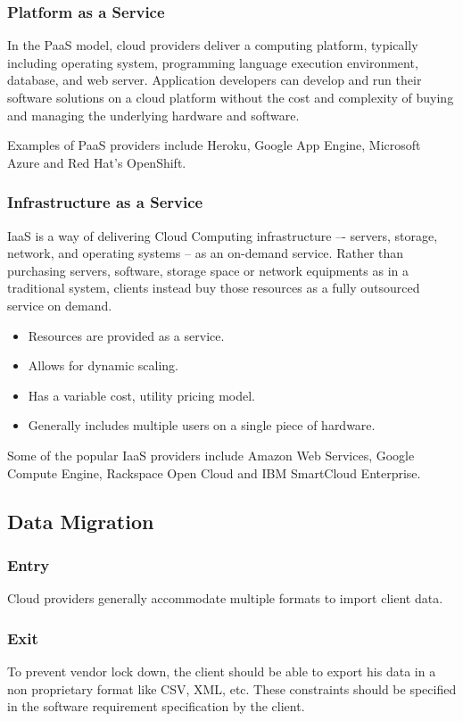 \documentclass[12pt,a4paper,oneside]{article}
\begin{document}
\subsubsection{Platform as a Service}
In the PaaS model, cloud providers deliver a computing platform, typically
including operating system, programming language execution environment,
database, and web server. Application developers can develop and run their
software solutions on a cloud platform without the cost and complexity of
buying and managing the underlying hardware and software.

Examples of PaaS providers include Heroku, Google App Engine, Microsoft Azure
and Red Hat's OpenShift.

\subsubsection{Infrastructure as a Service}
IaaS is a way of delivering Cloud Computing infrastructure –- servers, storage,
network, and operating systems – as an on-demand service. Rather than purchasing
servers, software, storage space or network equipments as in a traditional
system, clients instead buy those resources as a fully outsourced service on
demand.
\begin{itemize}
	\item Resources are provided as a service.
	\item Allows for dynamic scaling.
	\item Has a variable cost, utility pricing model.
	\item Generally includes multiple users on a single piece of hardware.
\end{itemize}
Some of the popular IaaS providers include Amazon Web Services, Google Compute
Engine, Rackspace Open Cloud and IBM SmartCloud Enterprise.

\subsection{Data Migration}
\subsubsection{Entry}
Cloud providers generally accommodate multiple formats to import client data.
\subsubsection{Exit}
To prevent vendor lock down, the client should be able to export his data in a
non proprietary format like CSV, XML, etc. These constraints should be
specified in the software requirement specification by the client.
\end{document}
